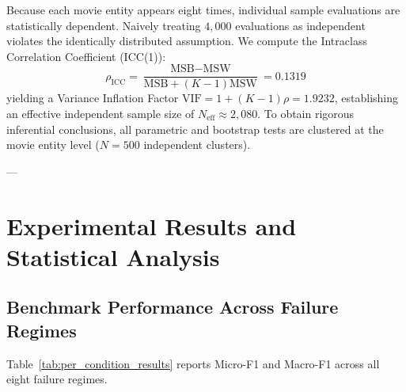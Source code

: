 \documentclass[journal]{IEEEtran}
\begin{document}
Because each movie entity appears eight times, individual sample evaluations are statistically dependent. Naively treating $4,000$ evaluations as independent violates the identically distributed assumption. We compute the Intraclass Correlation Coefficient (ICC(1)):
\begin{equation}
    \rho_{\text{ICC}} = \frac{\text{MSB} - \text{MSW}}{\text{MSB} + (K-1)\text{MSW}} = 0.1319
\end{equation}
yielding a Variance Inflation Factor $\text{VIF} = 1 + (K-1)\rho = 1.9232$, establishing an effective independent sample size of $N_{\text{eff}} \approx 2,080$. To obtain rigorous inferential conclusions, all parametric and bootstrap tests are clustered at the movie entity level ($N = 500$ independent clusters).

---

\section{Experimental Results and Statistical Analysis}

\subsection{Benchmark Performance Across Failure Regimes}
Table~\ref{tab:per_condition_results} reports Micro-F1 and Macro-F1 across all eight failure regimes.
\end{document}
